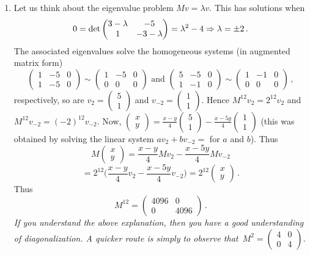 \begin{enumerate}
\item Let us think about the eigenvalue problem $Mv=\lambda v$. This has solutions when
\[
0={\rm det} \begin{pmatrix}3-\lambda & -5 \\ 1 & -3-\lambda\end{pmatrix}=\lambda^2-4\Rightarrow \lambda = \pm 2\, .
\]
The associated eigenvalues solve the homogeneous systems (in augmented matrix form)
\[
\left(\begin{array}{cc|c}1 & -5 & 0\\ 1 & -5 & 0\end{array}\right)\sim 
\left(\begin{array}{cc|c} 1 & -5 & 0\\ 0 & 0 & 0\end{array}\right)
\mbox{ and }
\left(\begin{array}{cc|c} 5 & -5 & 0\\ 1 & -1 & 0\end{array}\right)\sim 
\left(\begin{array}{cc|c} 1 & -1 & 0\\ 0 & 0 & 0\end{array}\right)\, ,\]
respectively, so are $v_2=\begin{pmatrix} 5 \\ 1 \end{pmatrix}$ and $v_{-2} = \begin{pmatrix} 1 \\ 1 \end{pmatrix}$.
Hence $M^{12} v_2 = 2^{12} v_2$ and $M^{12}v_{-2} = (-2)^{12} v_{-2}$. Now, $\begin{pmatrix} x \\ y \end{pmatrix}=\frac{x-y}{4}\begin{pmatrix} 5 \\ 1 \end{pmatrix} -\frac{x-5y}4  \begin{pmatrix} 1 \\ 1 \end{pmatrix}$
(this was obtained by solving the linear system $a v_2 + b v_{-2} = $ for $a$ and $b$). 
Thus
\[
M \begin{pmatrix} x \\ y \end{pmatrix} = \frac{x-y}{4} M v_2  -\frac{x-5y}4 M v_{-2}\] \[ = 2^{12} \Big(\frac{x-y}{4}  v_2 -\frac{x-5y}4  v_{-2}\Big) 
= 2^{12} \begin{pmatrix} x \\ y \end{pmatrix}\, .
\]
Thus \[M^{12}=\begin{pmatrix} 4096 & 0 \\ 0 & 4096\end{pmatrix}\, .\]
{\it If you understand the above explanation, then you have a good understanding of diagonalization.  A quicker route  
is simply to observe that~$M^2 = \begin{pmatrix}4 & 0 \\ 0 & 4\end{pmatrix} $.}


\end{enumerate}
